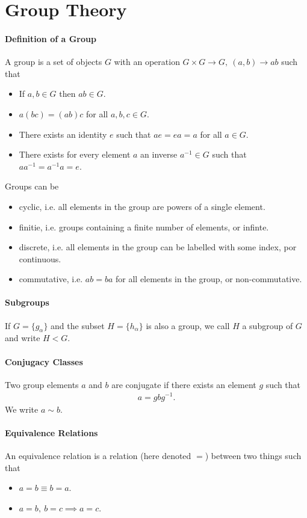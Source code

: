 \section{Group Theory}

\paragraph{Definition of a Group}
A group is a set of objects $G$ with an operation $G\times G\to G,\ (a, b)\to ab$ such that
\begin{itemize}
	\item If $a, b\in G$ then $ab\in G$.
	\item $a(bc) = (ab)c$ for all $a, b, c\in G$.
	\item There exists an identity $e$ such that $ae = ea = a$ for all $a\in G$.
	\item There exists for every element $a$ an inverse $a^{-1}\in G$ such that $aa^{-1} = a^{-1}a = e$.
\end{itemize}
Groups can be
\begin{itemize}
	\item cyclic, i.e. all elements in the group are powers of a single element.
	\item finitie, i.e. groups containing a finite number of elements, or infinte.
	\item discrete, i.e. all elements in the group can be labelled with some index, por continuous.
	\item commutative, i.e. $ab = ba$ for all elements in the group, or non-commutative.
\end{itemize}

\paragraph{Subgroups}
If $G = \{g_{\alpha}\}$ and the subset $H = \{h_{\alpha}\}$ is also a group, we call $H$ a subgroup of $G$ and write $H < G$.

\paragraph{Conjugacy Classes}
Two group elements $a$ and $b$ are conjugate if there exists an element $g$ such that
\begin{align*}
a = gbg^{-1}.
\end{align*}
We write $a\sim b$.

\paragraph{Equivalence Relations}
An equivalence relation is a relation (here denoted $=$) between two things such that
\begin{itemize}
	\item $a = b \equiv b = a$.
	\item $a = b,\ b = c\implies a = c$.
\end{itemize}

